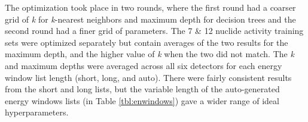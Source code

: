 The optimization took place in two rounds, where the first round had a coarser
grid of \textit{k} for \textit{k}-nearest neighbors and maximum depth for
decision trees and the second round had a finer grid of parameters. The 7 \& 12
nuclide activity training sets were optimized separately but contain averages
of the two results for the maximum depth, and the higher value of \textit{k}
when the two did not match. The \textit{k} and maximum depths were averaged
across all six detectors for each energy window list length (short, long, and
auto).  There were fairly consistent results from the short and long lists, but
the variable length of the auto-generated energy windows lists (in Table
\ref{tbl:enwindows}) gave a wider range of ideal hyperparameters.

